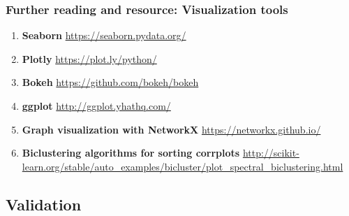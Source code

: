 \documentclass[11pt, twoside]{article}   	%
\begin{document}
\subsubsection{Further reading and resource: Visualization tools}
\renewcommand{\labelenumii}{\alph{enumii}}
\begin{enumerate}
  \item \textbf{Seaborn} \url{https://seaborn.pydata.org/}
 
  \item \textbf{Plotly} \url{https://plot.ly/python/}
  
   \item \textbf{Bokeh} \url{https://github.com/bokeh/bokeh}
 
  \item \textbf{ggplot} \url{http://ggplot.yhathq.com/}
   
  \item \textbf{Graph visualization with NetworkX} \url{https://networkx.github.io/}
  
  \item \textbf{Biclustering algorithms for sorting corrplots}   \url{http://scikit-learn.org/stable/auto_examples/bicluster/plot_spectral_biclustering.html}
  
  \end{enumerate}


\subsection{Validation}
\end{document}
